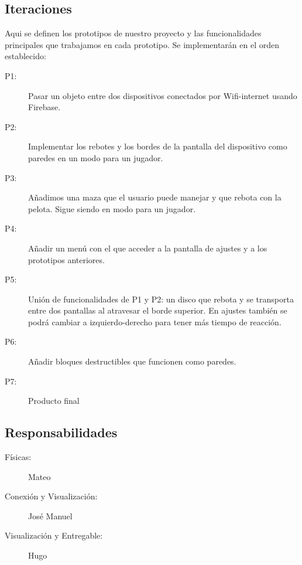\documentclass[a4paper,openright,12pt]{article}
\begin{document}
\subsection{Iteraciones}
Aqui se definen los prototipos de nuestro proyecto y las funcionalidades principales que trabajamos en cada prototipo. Se implementarán en el orden establecido:
\begin{description}
\item[P1:] Pasar un objeto entre dos dispositivos conectados por Wifi-internet usando Firebase.
\item[P2:] Implementar los rebotes y los bordes de la pantalla del dispositivo como paredes en un modo para un jugador.
\item[P3:] Añadimos una maza que el usuario puede manejar y que rebota con la pelota. Sigue siendo en modo para un jugador.
\item[P4:] Añadir un menú con el que acceder a la pantalla de ajustes y a los prototipos anteriores.
\item[P5:] Unión de funcionalidades de P1 y P2: un disco que rebota y se transporta entre dos pantallas al atravesar el borde superior. En ajustes también se podrá cambiar a izquierdo-derecho para tener más tiempo de reacción. 
\item[P6:] Añadir bloques destructibles que funcionen como paredes.
\item[P7:] Producto final
\end{description}
\subsection{Responsabilidades}
\begin{description}

\item[Físicas:] Mateo 
\item[Conexión y Visualización:] José Manuel
\item[Visualización y Entregable:] Hugo
\end{description}

\end{document}
